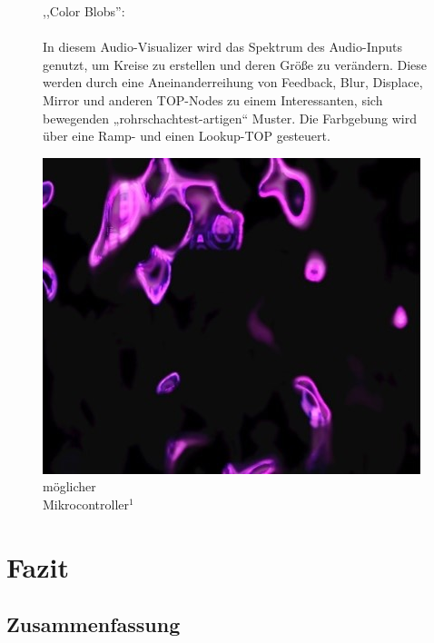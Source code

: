\documentclass[12pt]{scrartcl}%
\theoremstyle{nonumberplain}
\begin{document}
\begin{figure}[h]
   \begin{minipage}[b]{.4\linewidth}
     ,,Color Blobs'':
     \\\\
In diesem Audio-Visualizer wird das Spektrum des Audio-Inputs genutzt, um Kreise zu erstellen und deren Größe zu verändern. Diese werden durch eine Aneinanderreihung von Feedback, Blur, Displace, Mirror und anderen TOP-Nodes zu einem Interessanten, sich bewegenden „rohrschachtest-artigen“ Muster. Die Farbgebung wird über eine Ramp- und einen Lookup-TOP gesteuert.
   \end{minipage}
   \hspace{.1\linewidth}
   \begin{minipage}[b]{.4\linewidth}
      \includegraphics[width=\linewidth]{sunvox_6}
      \caption{möglicher\\Mikrocontroller${}^{1}$}
   \end{minipage}
\end{figure}


\newpage

\section{Fazit}

\subsection{Zusammenfassung}
\end{document}
